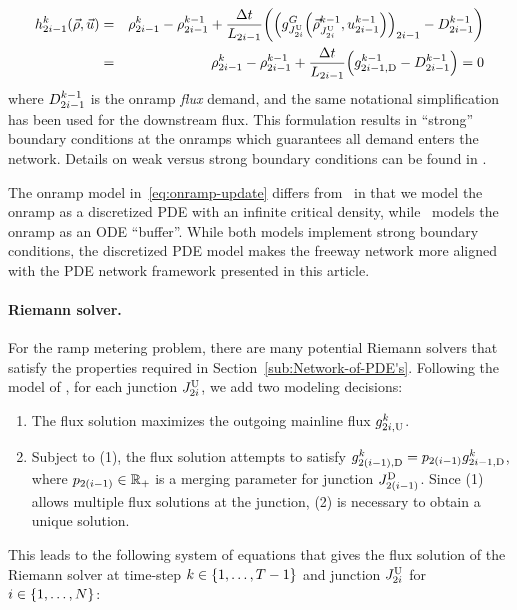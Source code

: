 			\begin{eqnarray}
				\syseq_{2\link-1}^{\tind}(\state,\control) & = & \discrete{2\link-1}{\tind}-\discrete{2\link-1}{\tind-1}+\frac{\Delta t}{\length_{2\link-1}}\left(\left(\god_{\jup{2\link}}\left(\juncstate{\jup{2\link}}{\tind-1},\ramp_{2\link-1}^{\tind-1}\right)\right)_{2\link-1}-\boundaryDemand{2\link-1}{\tind-1}\right)\label{eq:onramp-update}\\
				& = & \discrete{2\link-1}{\tind}-\discrete{2\link-1}{\tind-1}+\frac{\Delta t}{\length_{2\link-1}}\left(\fout{2\link-1}{\tind-1}-\boundaryDemand{2\link-1}{\tind-1}\right)=0
			\end{eqnarray}
			where $D_{2i-1}^{k-1}$ is the onramp \emph{flux
			}demand, and the same notational simplification has been used for
			the downstream flux. This formulation results in ``strong'' boundary
			conditions at the onramps which guarantees all demand enters the network.
			Details on weak versus strong boundary conditions can be found in
			\cite{Monache2013,strub2006weak,work2010traffic}.
						
			The onramp model in~\eqref{eq:onramp-update} differs from~\cite{Monache2013}
			in that we model the onramp as a discretized PDE with an infinite
			critical density, while~\cite{Monache2013} models the onramp
			as an ODE ``buffer''. While both models implement strong boundary
			conditions, the discretized PDE model makes the freeway network more
			aligned with the PDE network framework presented in this article.
						
						
			\paragraph{Riemann solver.}
						
			For the ramp metering problem, there are many potential Riemann solvers
			that satisfy the properties required in Section~\ref{sub:Network-of-PDE's}.
			Following the model of \cite{Monache2013}, for each junction $J_{2i}^{\text{U}}$,
			we add two modeling decisions:
			\begin{enumerate}
				\item The flux solution maximizes the outgoing mainline flux $g_{2i,\text{U}}^{k}$.
				\item Subject to (1), the flux solution attempts to satisfy $\fout{2\left(\link-1\right)}{\tind}=p_{2(\link-1)}\fout{2\link-1}{\tind}$,
				where $p_{2(i-1)}\in\mathbb{R}_{+}$ is a merging parameter for
				junction $\jdown{2\left(\link-1\right)}$. Since (1) allows multiple
				flux solutions at the junction, (2) is necessary to obtain a unique
				solution.
			\end{enumerate}
			This leads to the following system of equations that gives the flux
			solution of the Riemann solver at time-step $k\in\intrange 1{\ntime-1}$
			and junction $J_{2i}^{\text{U}}$ for $\link\in\intrange 1{\nlinks}$:
						
